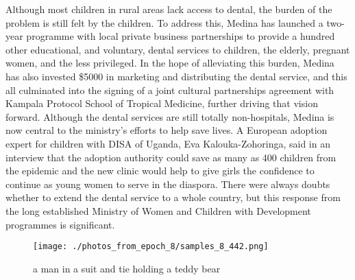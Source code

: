 \documentclass{article}%
\begin{document}
Although most children in rural areas lack access to dental, the burden of the problem is still felt by the children. To address this, Medina has launched a two{-}year programme with local private business partnerships to provide a hundred other educational, and voluntary, dental services to children, the elderly, pregnant women, and the less privileged.\newline%
In the hope of alleviating this burden, Medina has also invested \$5000 in marketing and distributing the dental service, and this all culminated into the signing of a joint cultural partnerships agreement with Kampala Protocol School of Tropical Medicine, further driving that vision forward.\newline%
Although the dental services are still totally non{-}hospitals, Medina is now central to the ministry's efforts to help save lives. A European adoption expert for children with DISA of Uganda, Eva Kalouka{-}Zohoringa, said in an interview that the adoption authority could save as many as 400 children from the epidemic and the new clinic would help to give girls the confidence to continue as young women to serve in the diaspora.\newline%
There were always doubts whether to extend the dental service to a whole country, but this response from the long established Ministry of Women and Children with Development programmes is significant.\newline%

%


\begin{figure}[h!]%
\centering%
\texttt{[image: ./photos\_from\_epoch\_8/samples\_8\_442.png]}%
\caption{a man in a suit and tie holding a teddy bear}%
\end{figure}

%
\end{document}
